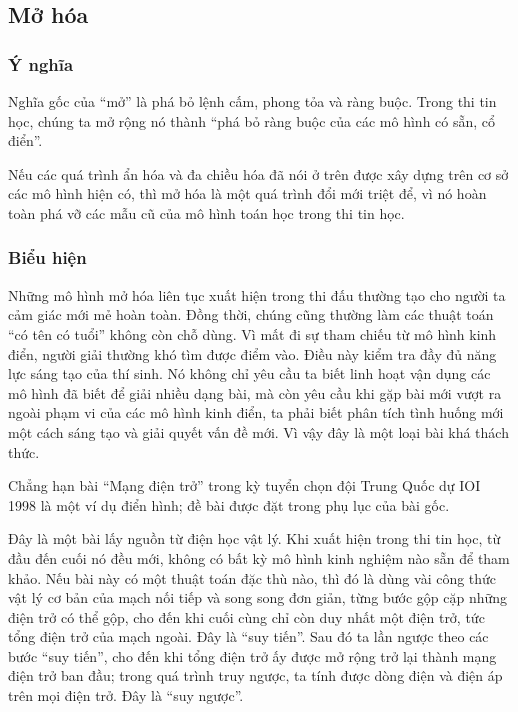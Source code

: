 \documentclass[11pt]{article}
\begin{document}
\subsection{Mở hóa}

\subsubsection{Ý nghĩa}

Nghĩa gốc của ``mở'' là phá bỏ lệnh cấm, phong tỏa và ràng buộc. Trong thi
tin học, chúng ta mở rộng nó thành ``phá bỏ ràng buộc của các mô hình có sẵn,
cổ điển''.

Nếu các quá trình ẩn hóa và đa chiều hóa đã nói ở trên được xây dựng trên cơ
sở các mô hình hiện có, thì mở hóa là một quá trình đổi mới triệt để, vì nó
hoàn toàn phá vỡ các mẫu cũ của mô hình toán học trong thi tin học.

\subsubsection{Biểu hiện}

Những mô hình mở hóa liên tục xuất hiện trong thi đấu thường tạo cho người ta
cảm giác mới mẻ hoàn toàn. Đồng thời, chúng cũng thường làm các thuật toán
``có tên có tuổi'' không còn chỗ dùng. Vì mất đi sự tham chiếu từ mô hình
kinh điển, người giải thường khó tìm được điểm vào. Điều này kiểm tra đầy đủ
năng lực sáng tạo của thí sinh. Nó không chỉ yêu cầu ta biết linh hoạt vận
dụng các mô hình đã biết để giải nhiều dạng bài, mà còn yêu cầu khi gặp bài
mới vượt ra ngoài phạm vi của các mô hình kinh điển, ta phải biết phân tích
tình huống mới một cách sáng tạo và giải quyết vấn đề mới. Vì vậy đây là một
loại bài khá thách thức.

Chẳng hạn bài ``Mạng điện trở'' trong kỳ tuyển chọn đội Trung Quốc dự IOI
1998 là một ví dụ điển hình; đề bài được đặt trong phụ lục của bài gốc.

Đây là một bài lấy nguồn từ điện học vật lý. Khi xuất hiện trong thi tin học,
từ đầu đến cuối nó đều mới, không có bất kỳ mô hình kinh nghiệm nào sẵn để
tham khảo. Nếu bài này có một thuật toán đặc thù nào, thì đó là dùng vài công
thức vật lý cơ bản của mạch nối tiếp và song song đơn giản, từng bước gộp cặp
những điện trở có thể gộp, cho đến khi cuối cùng chỉ còn duy nhất một điện
trở, tức tổng điện trở của mạch ngoài. Đây là ``suy tiến''. Sau đó ta lần
ngược theo các bước ``suy tiến'', cho đến khi tổng điện trở ấy được mở rộng
trở lại thành mạng điện trở ban đầu; trong quá trình truy ngược, ta tính được
dòng điện và điện áp trên mọi điện trở. Đây là ``suy ngược''.
\end{document}
